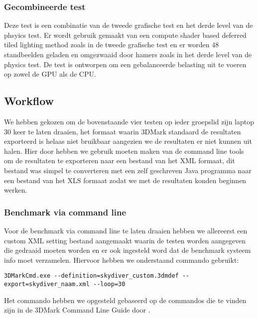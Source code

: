 
\subsubsection{Gecombineerde test}
Deze test is een combinatie van de tweede grafische test en het derde level van de phsyics test. Er wordt gebruik gemaakt van een compute shader based deferred tiled lighting method zoals in de tweede grafische test en er worden 48 standbeelden geladen en omgezwaaid door hamers zoals in het derde level van de physics test. De test is ontworpen om een gebalanceerde belasting uit te voeren op zowel de GPU als de CPU. \citep{3dmark_tech}


\subsection{Workflow}\label{moa-workflow}
We hebben gekozen om de bovenstaande vier testen op ieder groepslid zijn laptop 30 keer te laten draaien, het formaat waarin 3DMark standaard de resultaten exporteerd is helaas niet bruikbaar aangezien we de resultaten er niet kunnen uit halen. Hier door hebben we gebruik moeten maken van de command line tools om de resultaten te exporteren naar een bestand van het XML formaat, dit bestand was simpel te converteren met een zelf geschreven Java programma naar een bestand van het XLS formaat zodat we met de resultaten konden beginnen werken.

\subsubsection{Benchmark via command line}
Voor de benchmark via command line te laten draaien hebben we allereerst een custom XML setting bestand aangemaakt waarin de testen worden aangegeven die gedraaid moeten worden en er ook ingesteld word dat de benchmark systeem info moet verzamelen. Hiervoor hebben we onderstaand commando gebruikt:
\begin{lstlisting}
3DMarkCmd.exe --definition=skydiver_custom.3dmdef --export=skydiver_naam.xml --loop=30
\end{lstlisting}
Het commando hebben we opgesteld gebaseerd op de commandos die te vinden zijn in de 3DMark Command Line Guide door \cite{3dmark_cmd}. 
